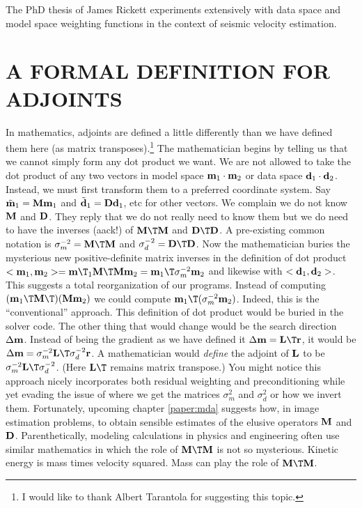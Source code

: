 \par
The PhD thesis of James Rickett experiments extensively
with data space and model space weighting functions
in the context of seismic velocity estimation.


\section{A FORMAL DEFINITION FOR ADJOINTS}

In mathematics, adjoints are defined a little differently than
we have defined them here
(as matrix transposes).\footnote{
	I would like to thank Albert Tarantola for suggesting this topic.
	}
The mathematician begins by telling us that we cannot simply
form any dot product we want.
We are not allowed to take the dot product of any two vectors
in model space
$\bold m_1 \cdot \bold m_2$ or data space
$\bold d_1 \cdot \bold d_2$.
Instead, we must first transform them to a preferred coordinate system.
Say
$\tilde{\bold m}_1 = \bold M {\bold m}_1$ and
$\tilde{\bold d}_1 = \bold D {\bold d}_1$, etc for other vectors.
We complain we do not know $\bold M$ and $\bold D$.
They reply that we do not really need to know them
but we do need to have the inverses (aack!) of
$\bold M\T\bold M$ and
$\bold D\T\bold D$.
A pre-existing common notation is
$\bold\sigma_m^{-2} = \bold M\T\bold M$ and
$\bold\sigma_d^{-2} = \bold D\T\bold D$.
Now the mathematician buries the mysterious new positive-definite
matrix inverses in the definition of dot product
$<\bold m_1,\bold m_2> = \bold m\T_1 \bold M\T\bold M \bold m_2 = \bold m_1\T \bold \sigma_m^{-2} \bold m_2$
and likewise with
$<\bold d_1,\bold d_2>$.
This suggests a total reorganization of our programs.
Instead of computing
$(\bold m_1\T \bold M\T) (\bold M \bold m_2)$
we could compute $\bold m_1\T (\bold\sigma_m^{-2} \bold m_2)$.
Indeed, this is the ``conventional'' approach.
This definition of dot product would be buried in the solver code.
The other thing that would change would be the search direction
$\Delta \bold m$.
Instead of being the gradient as we have defined it
$\Delta \bold m=\bold L\T\bold r$,
it would be
$\Delta \bold m=\bold\sigma_m^{-2} \bold L\T\bold\sigma_d^{-2}\bold r$.
A mathematician would
{\em define} the adjoint of $\bold L$ to be
$\bold\sigma_m^{-2} \bold L\T\bold\sigma_d^{-2}$.
(Here $\bold L\T$ remains matrix transpose.)
You might notice this approach nicely incorporates
both residual weighting and preconditioning
while yet evading the issue of where we get the matrices
$\sigma_m^2$ and $\sigma_d^2$ or how we invert them.
Fortunately, upcoming chapter \ref{paper:mda}
suggests how,
in image estimation problems,
to obtain sensible estimates of the elusive operators $\bold M$ and $\bold D$.
Parenthetically, modeling calculations in physics and engineering
often use similar mathematics
in which the role of $\bold M\T\bold M$ is not so mysterious.
Kinetic energy is mass times velocity squared.
Mass can play the role of $\bold M\T\bold M$.

